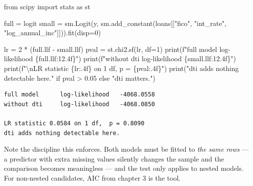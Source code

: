 \documentclass[
  letterpaper,
  10pt,
  twoside,
  openright,
  numbers=noenddot,
  chapterprefix=true]{scrbook}
\newenvironment{Shaded}{}{}
\newcommand{\BuiltInTok}[1]{\textcolor[rgb]{0.84,0.23,0.29}{#1}}
\newcommand{\CharTok}[1]{\textcolor[rgb]{0.01,0.18,0.38}{#1}}
\newcommand{\ControlFlowTok}[1]{\textcolor[rgb]{0.84,0.23,0.29}{#1}}
\newcommand{\DecValTok}[1]{\textcolor[rgb]{0.00,0.36,0.77}{#1}}
\newcommand{\FloatTok}[1]{\textcolor[rgb]{0.00,0.36,0.77}{#1}}
\newcommand{\ImportTok}[1]{\textcolor[rgb]{0.01,0.18,0.38}{#1}}
\newcommand{\NormalTok}[1]{\textcolor[rgb]{0.14,0.16,0.18}{#1}}
\newcommand{\OperatorTok}[1]{\textcolor[rgb]{0.14,0.16,0.18}{#1}}
\newcommand{\SpecialCharTok}[1]{\textcolor[rgb]{0.00,0.36,0.77}{#1}}
\newcommand{\SpecialStringTok}[1]{\textcolor[rgb]{0.01,0.18,0.38}{#1}}
\newcommand{\StringTok}[1]{\textcolor[rgb]{0.01,0.18,0.38}{#1}}
\begin{document}
\label{check-lr}
\begin{Shaded}
\begin{Highlighting}[]
\ImportTok{from}\NormalTok{ scipy }\ImportTok{import}\NormalTok{ stats }\ImportTok{as}\NormalTok{ st}

\NormalTok{full }\OperatorTok{=}\NormalTok{ logit}
\NormalTok{small }\OperatorTok{=}\NormalTok{ sm.Logit(y, sm.add\_constant(loans[[}\StringTok{"fico"}\NormalTok{, }\StringTok{"int\_rate"}\NormalTok{, }\StringTok{"log\_annual\_inc"}\NormalTok{]])).fit(disp}\OperatorTok{=}\DecValTok{0}\NormalTok{)}

\NormalTok{lr }\OperatorTok{=} \DecValTok{2} \OperatorTok{*}\NormalTok{ (full.llf }\OperatorTok{{-}}\NormalTok{ small.llf)}
\NormalTok{pval }\OperatorTok{=}\NormalTok{ st.chi2.sf(lr, df}\OperatorTok{=}\DecValTok{1}\NormalTok{)}
\BuiltInTok{print}\NormalTok{(}\SpecialStringTok{f"full model      log{-}likelihood }\SpecialCharTok{\{}\NormalTok{full}\SpecialCharTok{.}\NormalTok{llf}\SpecialCharTok{:12.4f\}}\SpecialStringTok{"}\NormalTok{)}
\BuiltInTok{print}\NormalTok{(}\SpecialStringTok{f"without dti     log{-}likelihood }\SpecialCharTok{\{}\NormalTok{small}\SpecialCharTok{.}\NormalTok{llf}\SpecialCharTok{:12.4f\}}\SpecialStringTok{"}\NormalTok{)}
\BuiltInTok{print}\NormalTok{(}\SpecialStringTok{f"}\CharTok{\textbackslash{}n}\SpecialStringTok{LR statistic }\SpecialCharTok{\{}\NormalTok{lr}\SpecialCharTok{:.4f\}}\SpecialStringTok{ on 1 df,  p = }\SpecialCharTok{\{}\NormalTok{pval}\SpecialCharTok{:.4f\}}\SpecialStringTok{"}\NormalTok{)}
\BuiltInTok{print}\NormalTok{(}\StringTok{"dti adds nothing detectable here."} \ControlFlowTok{if}\NormalTok{ pval }\OperatorTok{\textgreater{}} \FloatTok{0.05} \ControlFlowTok{else} \StringTok{"dti matters."}\NormalTok{)}
\end{Highlighting}
\end{Shaded}

\begin{verbatim}
full model      log-likelihood   -4068.0558
without dti     log-likelihood   -4068.0850

LR statistic 0.0584 on 1 df,  p = 0.8090
dti adds nothing detectable here.
\end{verbatim}

Note the discipline this enforces. Both models must be fitted to
\emph{the same rows} --- a predictor with extra missing values silently
changes the sample and the comparison becomes meaningless --- and the
test only applies to nested models. For non-nested candidates, AIC from
chapter 3 is the tool.
\end{document}
